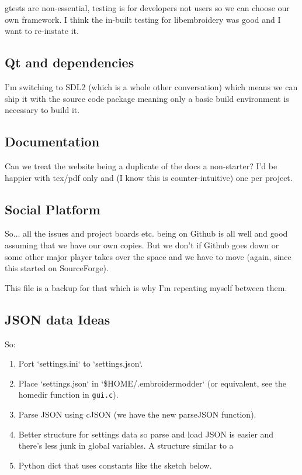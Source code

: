 \documentclass[10pt]{report}
\begin{document}
gtests are non-essential, testing is for developers not users so we can
choose our own framework. I think the in-built testing for libembroidery
was good and I want to re-instate it.

\subsection{Qt and dependencies}

I'm switching to SDL2 (which is a whole other conversation) which means
we can ship it with the source code package meaning only a basic build
environment is necessary to build it.

\subsection{Documentation}

Can we treat the website being a duplicate of the docs a non-starter?
I'd be happier with tex/pdf only and (I know this is counter-intuitive)
one per project.

\subsection{Social Platform}

So... all the issues and project boards etc. being on Github is all well and good assuming that we have our own copies. But we don't if Github goes down or some other major player takes over the space and we have to move (again, since this started on SourceForge).

This file is a backup for that which is why I'm repeating myself between them.

\subsection{JSON data Ideas}

So:

\begin{enumerate}
\item Port `settings.ini` to `settings.json`.
\item Place `settings.json` in `\$HOME/.embroidermodder` (or equivalent, see the homedir function in \texttt{gui.c}).
\item Parse JSON using cJSON (we have the new parseJSON function).
\item Better structure for settings data so parse and load JSON is easier and
   there's less junk in global variables. A structure similar to a
\item Python dict that uses constants like the sketch below.
\end{enumerate}
\end{document}
